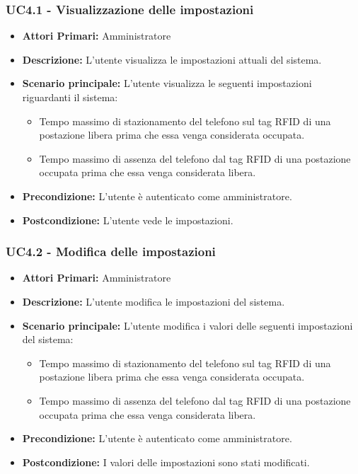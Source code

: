 \subsubsection{ UC4.1 - Visualizzazione delle impostazioni}
\begin{itemize}
	\item\textbf{Attori Primari:} 
	Amministratore
	\item\textbf{Descrizione:} 
	L'utente visualizza le impostazioni attuali del sistema.
	\item\textbf{Scenario principale:} 
	L'utente visualizza le seguenti impostazioni riguardanti il sistema:
	\begin{itemize}
		\item Tempo massimo di stazionamento del telefono sul tag RFID di una postazione libera prima che essa venga considerata occupata.
		\item Tempo massimo di assenza del telefono dal tag RFID di una postazione occupata prima che essa venga considerata libera.
	\end{itemize}
	\item\textbf{Precondizione:} 
	L'utente è autenticato come amministratore.
	\item\textbf{Postcondizione:}
	L'utente vede le impostazioni.
\end{itemize}

\subsubsection{ UC4.2 - Modifica delle impostazioni}
\begin{itemize}
	\item\textbf{Attori Primari:} 
	Amministratore
	\item\textbf{Descrizione:} 
	L'utente modifica le impostazioni del sistema.
	\item\textbf{Scenario principale:} 
	L'utente modifica i valori delle seguenti impostazioni del sistema:
	\begin{itemize}
		\item Tempo massimo di stazionamento del telefono sul tag RFID di una postazione libera prima che essa venga considerata occupata.
		\item Tempo massimo di assenza del telefono dal tag RFID di una postazione occupata prima che essa venga considerata libera.
	\end{itemize}
	\item\textbf{Precondizione:} 
	L'utente è autenticato come amministratore.
	\item\textbf{Postcondizione:}
	I valori delle impostazioni sono stati modificati.
\end{itemize}

